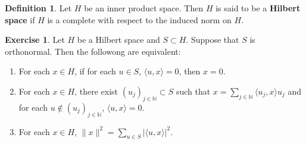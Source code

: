 \documentclass[12pt]{amsart}
\theoremstyle{definition}
\newtheorem{defn}[definition]{Definition}
\newtheorem{ex}[definition]{Exercise}
\newcommand{\N}{\mathbb{N}}
\newcommand{\tbf}[1]{\textbf{#1}}
\renewcommand{\r}{\rangle}
\renewcommand{\l}{\langle}
\DeclareMathOperator*{\0}{\mbf{0}}
\DeclareMathOperator*{\1}{\mbf{1}}
\newcommand{\lex}[1]{\label{ex:#1}}
\newcommand{\ld}[1]{\label{defn:#1}}
\begin{document}
\begin{defn} \ld{}
	Let $H$ be an inner product space. Then $H$ is said to be a \tbf{Hilbert space} if $H$ is a complete with respect to the induced norm on $H$.
\end{defn}

\begin{ex} \lex{}
Let $H$ be a Hilbert space and $S \subset H$. Suppose that  $S$ is orthonormal. Then the followong are equivalent: 
\begin{enumerate}
\item For each $x \in H$, if for each $u \in S$, $\l u, x \r = 0$, then $x =0$.
\item For each $x \in H$, there exist $(u_j)_{j\in \N} \subset S$ such that $x = \sum\limits_{j \in \N} \l u_j, x\r u_j$ and for each $u \not \in (u_j)_{j\in \N}$, $\l u, x\r =0$.
\item For each $x \in H$, $\|x\|^2 = \sum\limits_{u \in S} | \l u, x \r |^2$.
\end{enumerate}
\end{ex}
\end{document}
